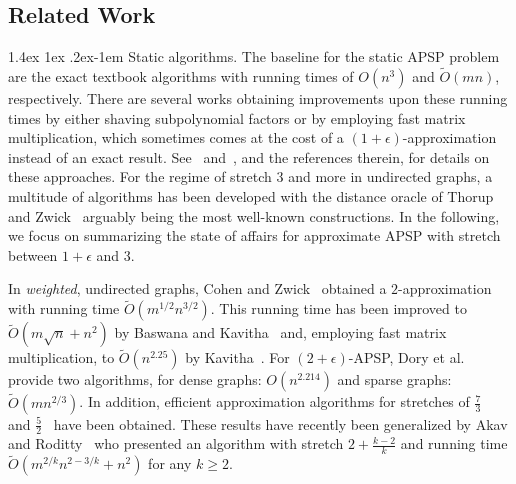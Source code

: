 \documentclass[11pt]{article}
\makeatletter
\theoremstyle{definition}
\theoremstyle{remark}
\renewcommand{\paragraph}{%
  \@startsection{paragraph}{4}%
  {\z@}{1.4ex \@plus 1ex \@minus .2ex}{-1em}%
  {\normalfont\normalsize\bfseries}%
}
\makeatother
\begin{document}
\begin{titlepage}


\subsection{Related Work}

\paragraph{Static algorithms.}
The baseline for the static APSP problem are the exact textbook algorithms with running times of $ O (n^3) $ and $ \tilde O (m n) $, respectively.
There are several works obtaining improvements upon these running times by either shaving subpolynomial factors or by employing fast matrix multiplication, which sometimes comes at the cost of a $ (1 + \epsilon) $-approximation instead of an exact result.
See~\cite{Zwick01} and~\cite{Williams18}, and the references therein, for details on these approaches.
For the regime of stretch $ 3 $ and more in undirected graphs, a multitude of algorithms has been developed with the distance oracle of Thorup and Zwick~\cite{TZ2005} arguably being the most well-known constructions.
In the following, we focus on summarizing the state of affairs for approximate APSP with stretch between $ 1 + \epsilon $ and $ 3 $.

In \emph{weighted}, undirected graphs, Cohen and Zwick~\cite{CohenZ01} obtained a $2$-approximation with running time $ \tilde O (m^{1/2} n^{3/2}) $.
This running time has been improved to $ \tilde O (m \sqrt{n} + n^2) $ by Baswana and Kavitha~\cite{BaswanaK10} and, employing fast matrix multiplication, to $ \tilde O (n^{2.25}) $ by Kavitha~\cite{Kavitha12}.
For $(2+\epsilon)$-APSP, Dory et al.~\cite{DoryFKNVV23} provide two algorithms, for dense graphs: $ O(n^{2.214})$ and sparse graphs: $\tilde O(mn^{2/3})$.
In addition, efficient approximation algorithms for stretches of $ \tfrac{7}{3} $~\cite{CohenZ01} and $ \tfrac{5}{2} $~\cite{Kavitha12} have been obtained.
These results have recently been generalized by Akav and Roditty~\cite{AkavR21} who presented an algorithm with stretch $ 2 + \tfrac{k-2}{k} $ and running time $ \tilde O (m^{2/k} n^{2 - 3/k} + n^2) $ for any $ k \geq 2 $.


\end{titlepage}
\end{document}
